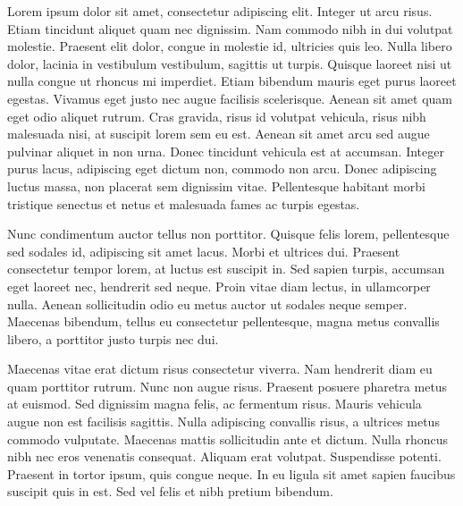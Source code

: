 
\noindent
Lorem ipsum dolor sit amet, consectetur adipiscing elit.\citep{Nacuzzi:2007} Integer ut arcu risus. Etiam tincidunt aliquet quam nec dignissim. Nam commodo nibh in dui volutpat molestie. Praesent elit dolor, congue in molestie id, ultricies quis leo. Nulla libero dolor, lacinia in vestibulum vestibulum, sagittis ut turpis. Quisque laoreet nisi ut nulla congue ut rhoncus mi imperdiet. Etiam bibendum mauris eget purus laoreet egestas.\citep{Cooper:1939} Vivamus eget justo nec augue facilisis scelerisque. Aenean sit amet quam eget odio aliquet rutrum. Cras gravida, risus id volutpat vehicula, risus nibh malesuada nisi, at suscipit lorem sem eu est. Aenean sit amet arcu sed augue pulvinar aliquet in non urna. Donec tincidunt vehicula est at accumsan. Integer purus lacus, adipiscing eget dictum non, commodo non arcu. Donec adipiscing luctus massa, non placerat sem dignissim vitae. Pellentesque habitant morbi tristique senectus et netus et malesuada fames ac turpis egestas.\citep{Fernandez:1892,carlin2010linguistics}

Nunc condimentum auctor tellus non porttitor.\citep{Febre:2005,algonquina:wigwams:online} Quisque felis lorem, pellentesque sed sodales id, adipiscing sit amet lacus. Morbi et ultrices dui. Praesent consectetur tempor lorem, at luctus est suscipit in. Sed sapien turpis, accumsan eget laoreet nec, hendrerit sed neque. Proin vitae diam lectus, in ullamcorper nulla.\citep{Sultzman:1999} Aenean sollicitudin odio eu metus auctor ut sodales neque semper. Maecenas bibendum, tellus eu consectetur pellentesque, magna metus convallis libero, a porttitor justo turpis nec dui.\citep{Britannica:Tehuelche:Online,Guia:Patagonia}

\lbpsepline

Maecenas vitae erat dictum risus consectetur viverra. Nam hendrerit diam eu quam porttitor rutrum. Nunc non augue risus. Praesent posuere pharetra metus at euismod. Sed dignissim magna felis, ac fermentum risus.\citep{Advent:2009} Mauris vehicula augue non est facilisis sagittis. Nulla adipiscing convallis risus, a ultrices metus commodo vulputate. Maecenas mattis sollicitudin ante et dictum. Nulla rhoncus nibh nec eros venenatis consequat. Aliquam erat volutpat.\citep{algonquina:lengua:online} Suspendisse potenti. Praesent in tortor ipsum, quis congue neque. In eu ligula sit amet sapien faucibus suscipit quis in est. Sed vel felis et nibh pretium bibendum.


